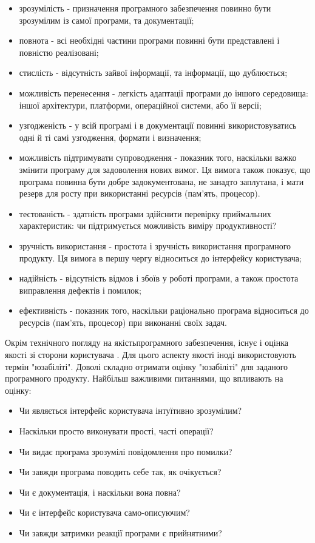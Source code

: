 \begin{itemize}
    \item зрозумілість - призначення програмного забезпечення 
      повинно бути зрозумілим із самої програми, та документації;
    \item повнота - всі необхідні частини програми
      повинні бути представлені і повністю реалізовані;
    \item стислість - відсутність зайвої інформації,
      та інформації, що дублюється;
    \item можливість перенесення - легкість адаптації
      програми до іншого середовища: іншої архітектури,
      платформи, операційної системи, або її версії;
    \item узгодженість - у всій програмі і в документації
      повинні використовуватись одні й ті самі узгодження, формати і визначення;
    \item можливість підтримувати супроводження - показник
      того, наскільки важко змінити програму для задоволення нових вимог.
      Ця вимога також показує, що програма повинна бути добре
      задокументована, не занадто заплутана, і мати резерв
      для росту при використанні ресурсів (пам’ять, процесор).
    \item тестованість - здатність програми здійснити перевірку
      приймальних характеристик: чи підтримується
      можливість виміру продуктивності?
    \item зручність використання - простота і зручність
      використання програмного продукту. Ця вимога
      в першу чергу відноситься до інтерфейсу користувача;
    \item надійність - відсутність відмов і збоїв у роботі
      програми, а також простота виправлення дефектів і помилок;
    \item ефективність - показник того, наскільки раціонально
      програма відноситься до ресурсів (пам’ять, процесор)
      при виконанні своїх задач.
\end{itemize}

Окрім технічного погляду на якістьпрограмного забезпечення,
існує і оцінка якості зі сторони користувача \cite{os-development,testing-black}.
Для цього аспекту якості іноді використовують термін "юзабіліті".
Доволі складно отримати оцінку "юзабіліті" для
заданого програмного продукту. Найбільш важливими питаннями,
що впливають на оцінку:

\begin{itemize}
    \item Чи являється інтерфейс користувача інтуїтивно зрозумілим?
    \item Наскільки просто виконувати прості, часті операції?
    \item Чи видає програма зрозумілі повідомлення про помилки?
    \item Чи завжди програма поводить себе так, як очікується?
    \item Чи є документація, і наскільки вона повна?
    \item Чи є інтерфейс користувача само-описуючим?
    \item Чи завжди затримки реакції програми є прийнятними?
\end{itemize}

